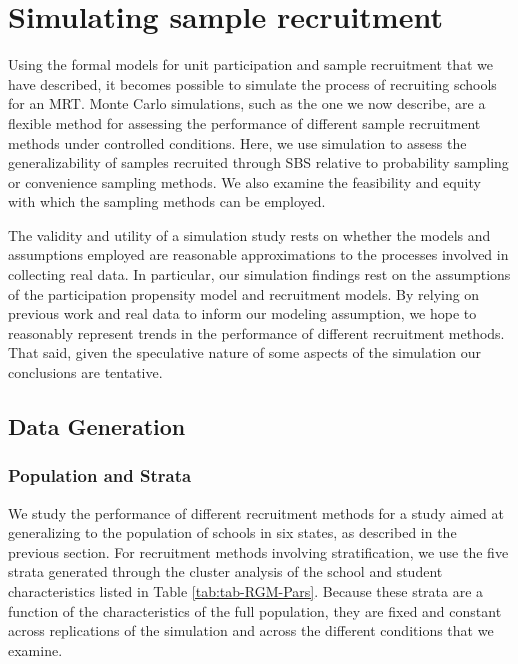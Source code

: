 \documentclass[english,man,floatsintext]{apa6}
\begin{document}
\hypertarget{simulating-sample-recruitment}{%
\section{Simulating sample recruitment}\label{simulating-sample-recruitment}}

Using the formal models for unit participation and sample recruitment that we have described, it becomes possible to simulate the process of recruiting schools for an MRT.
Monte Carlo simulations, such as the one we now describe, are a flexible method for assessing the performance of different sample recruitment methods under controlled conditions.
Here, we use simulation to assess the generalizability of samples recruited through SBS relative to probability sampling or convenience sampling methods. We also examine the feasibility and equity with which the sampling methods can be employed.

The validity and utility of a simulation study rests on whether the models and assumptions employed are reasonable approximations to the processes involved in collecting real data. In particular, our simulation findings rest on the assumptions of the participation propensity model and recruitment models. By relying on previous work and real data to inform our modeling assumption, we hope to reasonably represent trends in the performance of different recruitment methods. That said, given the speculative nature of some aspects of the simulation our conclusions are tentative. 

\hypertarget{data-generation}{%
\subsection{Data Generation}\label{data-generation}}

\hypertarget{population-and-strata}{%
\subsubsection{Population and Strata}\label{population-and-strata}}

We study the performance of different recruitment methods for a study aimed at generalizing to the population of schools in six states, as described in the previous section. For recruitment methods involving stratification, we use the five strata generated through the cluster analysis of the school and student characteristics listed in Table \ref{tab:tab-RGM-Pars}.
Because these strata are a function of the characteristics of the full population, they are fixed and constant across replications of the simulation and across the different conditions that we examine.
\end{document}
